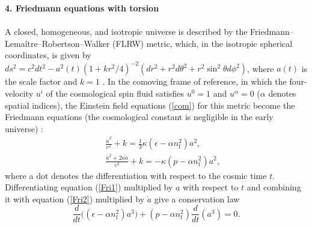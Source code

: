 \documentclass[prd,onecolumn,nofootinbib]{revtex4}
\begin{document}
{\bf 4. Friedmann equations with torsion}\\ \\
A closed, homogeneous, and isotropic universe is described by the Friedmann--Lema\^{i}tre--Robertson--Walker (FLRW) metric, which, in the isotropic spherical coordinates, is given by $ds^2=c^2 dt^2-a^2(t)(1+kr^2/4)^{-2}(dr^2+r^2 d\theta^2+r^2\sin^2\theta d\phi^2)$, where $a(t)$ is the scale factor and $k=1$ \cite{Lor,LL2}.
In the comoving frame of reference, in which the four-velocity $u^i$ of the cosmological spin fluid satisfies $u^0=1$ and $u^\alpha=0$ ($\alpha$ denotes spatial indices), the Einstein field equations (\ref{com}) for this metric become the Friedmann equations (the cosmological constant is negligible in the early universe) \cite{Gas,Bre,torsion1,Kuc}:
\begin{eqnarray}
& & \frac{{\dot{a}}^2}{c^2}+k=\frac{1}{3}\kappa(\epsilon-\alpha n_\textrm{f}^2)a^2, \label{Fri1} \\
& & \frac{{\dot{a}}^2+2a\ddot{a}}{c^2}+k=-\kappa(p-\alpha n_\textrm{f}^2)a^2,
\label{Fri2}
\end{eqnarray}
where a dot denotes the differentiation with respect to the cosmic time $t$.
Differentiating equation (\ref{Fri1}) multiplied by $a$ with respect to $t$ and combining it with equation (\ref{Fri2}) multiplied by $\dot{a}$ give a conservation law
\begin{equation}
\frac{d}{dt}\bigl((\epsilon-\alpha n_\textrm{f}^2)a^3\bigr)+(p-\alpha n_\textrm{f}^2)\frac{d}{dt}(a^3)=0.
\label{law}
\end{equation}
\end{document}
